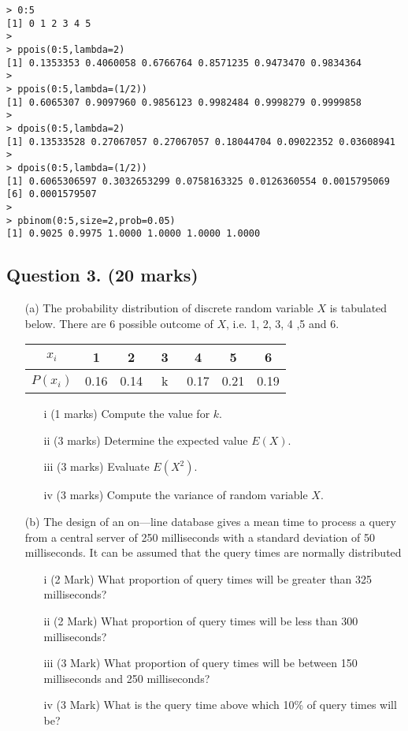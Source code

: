 \begin{framed}
\begin{verbatim}
> 0:5
[1] 0 1 2 3 4 5
>
> ppois(0:5,lambda=2)
[1] 0.1353353 0.4060058 0.6766764 0.8571235 0.9473470 0.9834364
>
> ppois(0:5,lambda=(1/2))
[1] 0.6065307 0.9097960 0.9856123 0.9982484 0.9998279 0.9999858
>
> dpois(0:5,lambda=2)
[1] 0.13533528 0.27067057 0.27067057 0.18044704 0.09022352 0.03608941
>
> dpois(0:5,lambda=(1/2))
[1] 0.6065306597 0.3032653299 0.0758163325 0.0126360554 0.0015795069
[6] 0.0001579507
>
> pbinom(0:5,size=2,prob=0.05)
[1] 0.9025 0.9975 1.0000 1.0000 1.0000 1.0000

\end{verbatim}
\end{framed}
\newpage
\subsection*{Question 3. (20 marks) }
\begin{itemize}
\item[(a)]
 The probability distribution of discrete random variable $X$ is tabulated below. There are 6 possible outcome of $X$, i.e. 1, 2, 3, 4 ,5 and 6.
\begin{center}
\begin{tabular}{|c||c|c|c|c|c|c|}
\hline
$x_i$  & 1 & 2 & 3 & 4 & 5 & 6 \\\hline
$P(x_i)$ & 0.16 & 0.14 & \mbox{   k   } & 0.17 & 0.21 & 0.19\\
\hline
\end{tabular}
\end{center}

\begin{itemize}
\item[i] (1 marks) Compute the value for $k$.
\item[ii] (3 marks) Determine the expected value $E(X)$.
\item[iii] (3 marks) Evaluate $E(X^2)$.
\item[iv] (3 marks) Compute the variance of random variable $X$.
\end{itemize}

\item[(b)] The design of an on—line database gives a mean time to process a query from a central server of 250 milliseconds with a standard deviation of 50 milliseconds. It can be assumed that
the query times are normally distributed
\begin{itemize}
\item[i] (2 Mark) What proportion of query times will be greater than 325
milliseconds?
\item[ii] (2 Mark) What proportion of query times will be less than 300
milliseconds?
\item[iii] (3 Mark) What proportion of query times will be between 150
milliseconds and 250 milliseconds?
\item[iv] (3 Mark) What is the query time above which 10\% of query times
will be?
\end{itemize}
\end{itemize}

